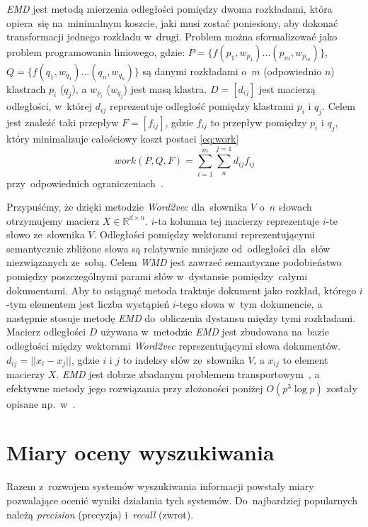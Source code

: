\documentclass[pl]{minipw} %
\begin{document}
\textit{EMD} jest metodą mierzenia odległości pomiędzy dwoma rozkładami, która opiera~się na~minimalnym koszcie, jaki musi zostać poniesiony, aby dokonać transformacji jednego rozkładu w~drugi. Problem można sformalizować jako problem programowania liniowego, gdzie:
$P=\{f(p_1,w_{p_1})...(p_m,w_{p_m})\}$, $Q=\{f(q_1,w_{q_1})...(q_n,w_{q_n})\}$ są danymi rozkładami o~$m$ (odpowiednio $n$) klastrach $p_i$ ($q_j$), a $w_{p_i}$ ($w_{q_j}$) jest masą klastra. $D=[d_{ij}]$ jest macierzą odległości, w~której $d_{ij}$ reprezentuje odległość pomiędzy klastrami $p_i$ i $q_j$. Celem jest znaleźć taki przepływ $F = [f_{ij}]$, gdzie $f_{ij}$ to przepływ pomiędzy $p_i$ i $q_j$, który minimalizuje całościowy koszt postaci \ref{eq:work}
\begin{equation}
\label{eq:work}
work(P, Q, F) = \sum_{i=1}^{m}\sum_{n}^{j=1}d_{ij}f_{ij}
\end{equation}
przy~odpowiednich ograniczeniach~\cite{emd}.

Przypuśćmy, że dzięki metodzie \textit{Word2vec} dla~słownika $V$ o~$n$ słowach otrzymujemy macierz $X \in \mathbb{R}^{d \times n}$. $i$-ta kolumna tej macierzy reprezentuje $i$-te słowo ze~słownika $V$. Odległości pomiędzy wektorami reprezentującymi semantycznie zbliżone słowa są relatywnie mniejsze od~odległości dla~słów niezwiązanych ze~sobą. Celem \textit{WMD} jest zawrzeć semantyczne podobieństwo pomiędzy poszczególnymi parami słów w~dystansie pomiędzy~całymi dokumentami. Aby to osiągnąć metoda traktuje dokument jako rozkład, którego $i$-tym elementem jest liczba wystąpień $i$-tego słowa w~tym dokumencie, a następnie stosuje metodę \textit{EMD} do~obliczenia dystansu między tymi rozkładami. Macierz odległości $D$ używana w~metodzie \textit{EMD} jest zbudowana na~bazie odległości między wektorami \textit{Word2vec} reprezentującymi słowa dokumentów. $d_{ij} = ||x_i-x_j||$, gdzie $i$ i $j$ to indeksy słów ze~słownika $V$, a $x_{ij}$ to element macierzy $X$. \textit{EMD} jest dobrze zbadanym problemem transportowym~\cite{emd}, a efektywne metody jego rozwiązania przy złożoności poniżej $O(p^3\log p)$ zostały opisane np.~w~\cite{emd_method}. 


\section{Miary oceny wyszukiwania}

Razem z~rozwojem systemów wyszukiwania informacji powstały miary pozwalające ocenić wyniki działania tych systemów. Do~najbardziej popularnych należą \textit{precision} (precyzja) i~\textit{recall} (zwrot).
\end{document}
